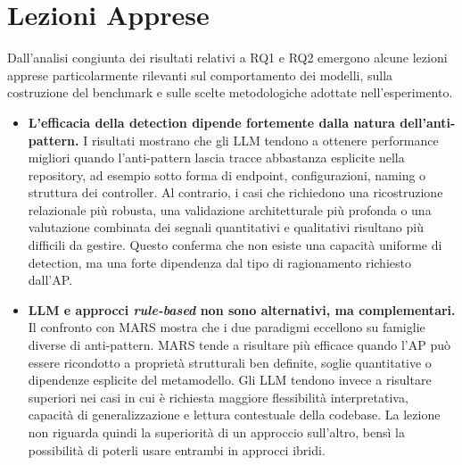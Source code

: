 \section{Lezioni Apprese}

Dall’analisi congiunta dei risultati relativi a RQ1 e RQ2 emergono alcune lezioni apprese particolarmente rilevanti sul comportamento dei modelli, sulla costruzione del benchmark e sulle scelte metodologiche adottate nell’esperimento.

\begin{itemize}
    \item \textbf{L’efficacia della detection dipende fortemente dalla natura dell’anti-pattern.}  
    I risultati mostrano che gli LLM tendono a ottenere performance migliori quando l’anti-pattern lascia tracce abbastanza esplicite nella repository, ad esempio sotto forma di endpoint, configurazioni, naming o struttura dei controller. Al contrario, i casi che richiedono una ricostruzione relazionale più robusta, una validazione architetturale più profonda o una valutazione combinata dei segnali quantitativi e qualitativi risultano più difficili da gestire. Questo conferma che non esiste una capacità uniforme di detection, ma una forte dipendenza dal tipo di ragionamento richiesto dall'AP.

    \item \textbf{LLM e approcci \textit{rule-based} non sono alternativi, ma complementari.}  
    Il confronto con MARS mostra che i due paradigmi eccellono su famiglie diverse di anti-pattern. MARS tende a risultare più efficace quando l'AP può essere ricondotto a proprietà strutturali ben definite, soglie quantitative o dipendenze esplicite del metamodello. Gli LLM tendono invece a risultare superiori nei casi in cui è richiesta maggiore flessibilità interpretativa, capacità di generalizzazione e lettura contestuale della codebase. La lezione non riguarda quindi la superiorità di un approccio sull'altro, bensì la possibilità di poterli usare entrambi in approcci ibridi.


\end{itemize}
